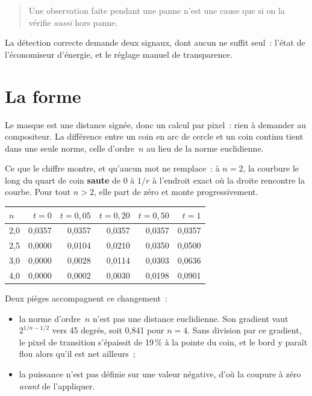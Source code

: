 \documentclass[11pt,a4paper]{article}
\newcommand{\np}[1]{#1}
\begin{document}
\begin{quote}
Une observation faite pendant une panne n'est une cause que si on la vérifie
\emph{aussi} hors panne.
\end{quote}

La détection correcte demande deux signaux, dont aucun ne suffit seul~: l'état
de l'économiseur d'énergie, et le réglage manuel de transparence.

\section{La forme}

Le masque est une distance signée, donc un calcul par pixel~: rien à demander
au compositeur. La différence entre un coin en arc de cercle et un coin
continu tient dans une seule norme, celle d'ordre~$n$ au lieu de la norme
euclidienne.

Ce que le chiffre montre, et qu'aucun mot ne remplace~: à $n = 2$, la courbure
le long du quart de coin \textbf{saute} de 0 à $1/r$ à l'endroit exact où la
droite rencontre la courbe. Pour tout $n > 2$, elle part de zéro et monte
progressivement.

\begin{center}
\small
\begin{tabular}{lrrrrr}
\toprule
$n$ & $t = 0$ & $t = 0{,}05$ & $t = 0{,}20$ & $t = 0{,}50$ & $t = 1$ \\
\midrule
\np{2,0} & \np{0,0357} & \np{0,0357} & \np{0,0357} & \np{0,0357} & \np{0,0357} \\
\np{2,5} & \np{0,0000} & \np{0,0104} & \np{0,0210} & \np{0,0350} & \np{0,0500} \\
\np{3,0} & \np{0,0000} & \np{0,0028} & \np{0,0114} & \np{0,0303} & \np{0,0636} \\
\np{4,0} & \np{0,0000} & \np{0,0002} & \np{0,0030} & \np{0,0198} & \np{0,0901} \\
\bottomrule
\end{tabular}
\end{center}

Deux pièges accompagnent ce changement~:

\begin{itemize}
\item la norme d'ordre~$n$ n'est pas une distance euclidienne. Son gradient
vaut $2^{1/n - 1/2}$ vers 45 degrés, soit \np{0,841} pour $n = 4$. Sans
division par ce gradient, le pixel de transition s'épaissit de 19\,\% à la
pointe du coin, et le bord y paraît flou alors qu'il est net ailleurs~;
\item la puissance n'est pas définie sur une valeur négative, d'où la coupure à
zéro \emph{avant} de l'appliquer.
\end{itemize}
\end{document}
